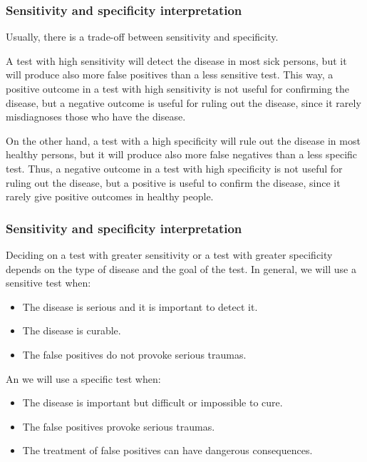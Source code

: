\begin{frame}
\frametitle{Sensitivity and specificity interpretation}
Usually, there is a trade-off between sensitivity and specificity.  

A test with high sensitivity will detect the disease in most sick persons, but it will produce also more false positives than a less sensitive test. 
This way, a positive outcome in a test with high sensitivity is not useful for confirming the disease, but a negative outcome is useful for ruling out the disease, since it rarely misdiagnoses those who have the disease.

On the other hand, a test with a high specificity will rule out the disease in most healthy persons, but it will produce also more false negatives than a less specific test. 
Thus, a negative outcome in a test with high specificity is not useful for ruling out the disease, but a positive is useful to confirm the disease, since it rarely give positive outcomes in healthy people.  
\end{frame}


\begin{frame}
\frametitle{Sensitivity and specificity interpretation}
Deciding on a test with greater sensitivity or a test with greater specificity depends on the type of disease and the
goal of the test.
In general, we will use a sensitive test when:
\begin{itemize}
\item The disease is serious and it is important to detect it. 
\item The disease is curable. 
\item The false positives do not provoke serious traumas.
\end{itemize}

An we will use a specific test when:
\begin{itemize}
\item The disease is important but difficult or impossible to cure.
\item The false positives provoke serious traumas. 
\item The treatment of false positives can have dangerous consequences.  
\end{itemize}
\end{frame}


